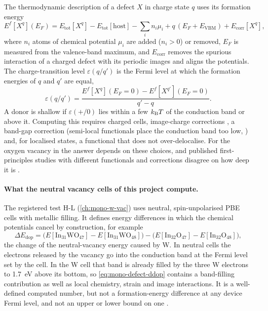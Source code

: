 The thermodynamic description of a defect $X$ in charge state $q$ uses its formation energy
\citep{VandeWalle2004,Freysoldt2014}
\begin{equation}
E^f[X^q](E_F) = E_{\mathrm{tot}}[X^q] - E_{\mathrm{tot}}[\mathrm{host}] - \sum_i n_i\mu_i + q\,(E_F + E_{\mathrm{VBM}})
 + E_{\mathrm{corr}}[X^q] ,
\label{eq:mono-defect-ef}
\end{equation}
where $n_i$ atoms of chemical potential $\mu_i$ are added ($n_i>0$) or removed, $E_F$ is measured from the
valence-band maximum, and $E_{\mathrm{corr}}$ removes the spurious interaction of a charged defect with its periodic
images and aligns the potentials. The charge-transition level $\varepsilon(q/q')$ is the Fermi level at which the
formation energies of $q$ and $q'$ are equal,
\begin{equation}
\varepsilon(q/q') = \frac{E^f[X^q](E_F{=}0) - E^f[X^{q'}](E_F{=}0)}{q'-q} .
\label{eq:mono-defect-ctl}
\end{equation}
A donor is shallow if $\varepsilon(+/0)$ lies within a few $k_{\mathrm{B}}T$ of the conduction band or above it. Computing this
requires charged cells, image-charge corrections \citep{Freysoldt2014}, a band-gap correction (semi-local functionals
place the conduction band too low, \citealp{Lany2008}) and, for localised states, a functional that does not
over-delocalise. For the oxygen vacancy in \InO{} the answer depends on these choices, and published first-principles
studies with different functionals and corrections disagree on how deep it is
\citep{Lany2007,Agoston2009,Buckeridge2018,Chatratin2019}.

\paragraph{What the neutral vacancy cells of this project compute.} The registered test H-L (\cref{ch:mono-w-vac}) uses
neutral, spin-unpolarised PBE cells with metallic filling. It defines energy differences in which the chemical
potentials cancel by construction, for example
\begin{equation}
\Delta E_{\mathrm{dop}} = \big(E[\mathrm{In_{31}WO_{47}}] - E[\mathrm{In_{31}WO_{48}}]\big) - \big(E[\mathrm{In_{32}O_{47}}] - E[\mathrm{In_{32}O_{48}}]\big),
\label{eq:mono-defect-ddop}
\end{equation}
the change of the neutral-vacancy energy caused by W. In neutral cells the electrons released by the vacancy go into the
conduction band at the Fermi level set by the cell. In the W cell that band is already filled by the three W electrons
to 1.7~eV above its bottom, so \cref{eq:mono-defect-ddop} contains a band-filling contribution as well as local
chemistry, strain and image interactions. It is a well-defined computed number, but not a formation-energy difference
at any device Fermi level, and not an upper or lower bound on one .

